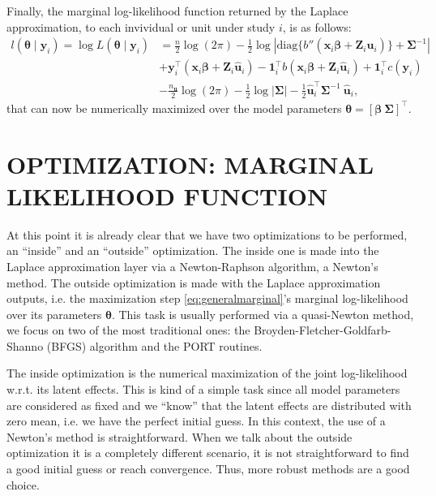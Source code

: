 Finally, the marginal log-likelihood function returned by the Laplace
approximation, to each invividual or unit under study \(i\), is as
follows:
\begin{equation}
  \begin{aligned}
    l(\bm{\theta} \mid \mathbf{y}_{i}) =
    \log L(\bm{\theta} \mid \mathbf{y}_{i}) &=
    \frac{n}{2} \log (2\pi) - \frac{1}{2} \log
    \left|
      \text{diag}\{{b}''(\bm{x}_{i}\bm{\beta} +
      \mathbf{Z}_{i}\mathbf{\hat{u}}_{i})\} + \bm{\Sigma}^{-1}
    \right|\\
    &+ \mathbf{y}_{i}^{\top}
    (\bm{x}_{i}\bm{\beta} + \mathbf{Z}_{i}\mathbf{\hat{u}}_{i}) -
    \mathbf{1}_{i}^{\top}
    b(\bm{x}_{i}\bm{\beta} + \mathbf{Z}_{i}\mathbf{\hat{u}}_{i}) +
    \mathbf{1}_{i}^{\top} c(\mathbf{y}_{i})\\
    &- \frac{n_{\mathbf{u}}}{2} \log (2\pi) -
    \frac{1}{2} \log |\bm{\Sigma}| - \frac{1}{2}
    \mathbf{\hat{u}}_{i}^{\top}\bm{\Sigma}^{-1}~\mathbf{\hat{u}}_{i},
  \end{aligned}
  \nonumber
\end{equation}
that can now be numerically maximized over the model parameters
\(\bm{\theta} = [\bm{\beta}~\bm{\Sigma}]^{\top}\).

\section{OPTIMIZATION: MARGINAL LIKELIHOOD FUNCTION}
\label{cap:opt}

At this point it is already clear that we have two optimizations to be
performed, an ``inside'' and an ``outside'' optimization. The inside one
is made into the Laplace approximation layer via a Newton-Raphson
algorithm, a Newton's method. The outside optimization is made with the
Laplace approximation outputs, i.e. the maximization step
\autoref{eq:generalmarginal}'s marginal log-likelihood over its
parameters \(\bm{\theta}\). This task is usually performed via a
quasi-Newton method, we focus on two of the most traditional ones: the
Broyden-Fletcher-Goldfarb-Shanno (BFGS) algorithm and the PORT routines.

The inside optimization is the numerical maximization of the joint
log-likelihood w.r.t. its latent effects. This is kind of a simple task
since all model parameters are considered as fixed and we ``know'' that
the latent effects are distributed with zero mean, i.e. we have the
perfect initial guess. In this context, the use of a Newton's method is
straightforward. When we talk about the outside optimization it is a
completely different scenario, it is not straightforward to find a good
initial guess or reach convergence. Thus, more robust methods are a good
choice.

